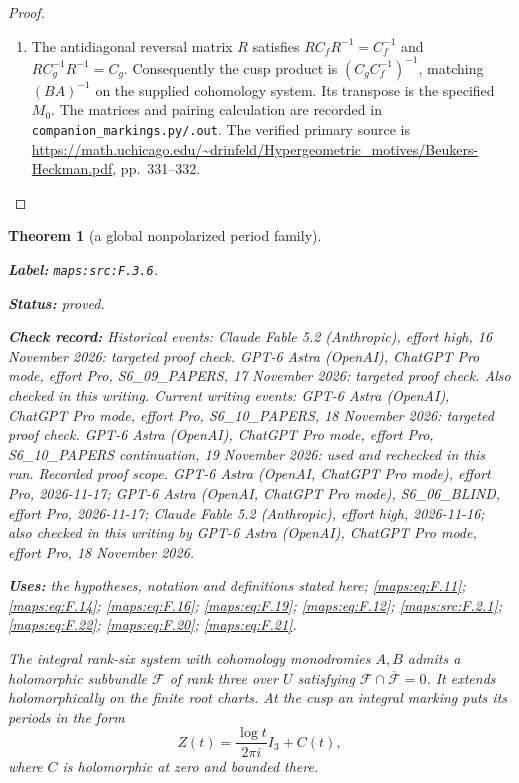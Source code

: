 \documentclass[11pt,a4paper]{article}
\newtheorem{theorem}{Theorem}[section]
\theoremstyle{definition}
\newcommand{\StatementRecord}[4]{\par\smallskip\begingroup\upshape\raggedright\noindent\textbf{Label:} \nolinkurl{#1}.\par\noindent\textbf{Status:} #2.\par\noindent\textbf{Check record:} #3.\par\noindent\textbf{Uses:} #4.\par\endgroup\smallskip}
\begin{document}
\begin{proof}
\begin{enumerate}[label=\arabic*.]
\item The antidiagonal reversal matrix $R$ satisfies
$RC_fR^{-1}=C_f^{-1}$ and $RC_g^{-1}R^{-1}=C_g$.
Consequently the cusp product is $(C_gC_f^{-1})^{-1}$, matching
$(BA)^{-1}$ on the supplied cohomology system.  Its transpose is the
specified $M_0$.  The matrices and pairing calculation are recorded in
\texttt{companion\_markings.py/.out}.  The verified primary source is
\url{https://math.uchicago.edu/~drinfeld/Hypergeometric_motives/Beukers-Heckman.pdf},
pp.~331--332.

\end{enumerate}
\end{proof}




\begin{theorem}[a global nonpolarized period family]\label{maps:src:F.3.6}
\StatementRecord{maps:src:F.3.6}{proved}{Historical events: Claude Fable 5.2 (Anthropic), effort high, 16 November 2026: targeted proof check. GPT-6 Astra (OpenAI), ChatGPT Pro mode, effort Pro, S6\_09\_PAPERS, 17 November 2026: targeted proof check. Also checked in this writing. Current writing events: GPT-6 Astra (OpenAI), ChatGPT Pro mode, effort Pro, S6\_10\_PAPERS, 18 November 2026: targeted proof check. GPT-6 Astra (OpenAI), ChatGPT Pro mode, effort Pro, S6\_10\_PAPERS continuation, 19 November 2026: used and rechecked in this run. \emph{Recorded proof scope.} GPT-6 Astra (OpenAI, ChatGPT Pro mode), effort Pro, 2026-11-17; GPT-6 Astra (OpenAI, ChatGPT Pro mode), S6\_06\_BLIND, effort Pro, 2026-11-17; Claude Fable 5.2 (Anthropic), effort high, 2026-11-16; also checked in this writing by GPT-6 Astra (OpenAI), ChatGPT Pro mode, effort Pro, 18 November 2026}{the hypotheses, notation and definitions stated here; \cref{maps:eq:F.11}; \cref{maps:eq:F.14}; \cref{maps:eq:F.16}; \cref{maps:eq:F.19}; \cref{maps:eq:F.12}; \cref{maps:src:F.2.1}; \cref{maps:eq:F.22}; \cref{maps:eq:F.20}; \cref{maps:eq:F.21}}


The integral rank-six system with cohomology monodromies $A,B$
admits a holomorphic subbundle $\mathcal F$ of rank three over
$U$ satisfying $\mathcal F\cap\overline{\mathcal F}=0$.
It extends holomorphically on the finite root charts.  At the
cusp an integral marking puts its periods in the form
\[
 Z(t)=\frac{\log t}{2\pi i}I_3+C(t),
 \tag{F.13}\label{maps:eq:F.13}
\]
where $C$ is holomorphic at zero and bounded there.

\end{theorem}
\end{document}
